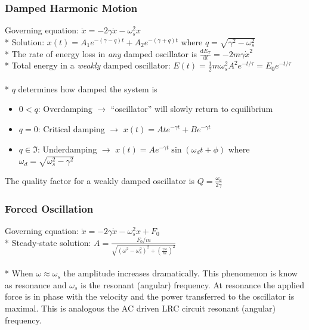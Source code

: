 \subsubsection{Damped Harmonic Motion}
Governing equation: \(\ddot{x}=-2\gamma\dot{x}-\omega_s^2x\)\\*
Solution: \(x(t)=A_1e^{-(\gamma-q)t}+A_2e^{-(\gamma+q)t}\) where \(q=\sqrt{\gamma^2-\omega_s^2}\)\\*
The rate of energy loss in \emph{any} damped oscillator is \(\frac{\mathrm{d}E_T}{\mathrm{d}t}=-2m\gamma\dot{x}^2\)\\*
Total energy in a \emph{weakly} damped oscillator: \(E(t)=\frac{1}{2}m\omega_s^2A^2e^{-t/\tau}=E_0e^{-t/\tau}\)\\\\*
\(q\) determines how damped the system is
\begin{itemize}
\item \(0<q\): Overdamping \(\to\) ``oscillator'' will slowly return to equilibrium
\item \(q=0\): Critical damping \(\to\) \(x(t)=Ate^{-\gamma t}+Be^{-\gamma t}\)
\item \(q\in\Im\): Underdamping \(\to\) \(x(t)=Ae^{-\gamma t}\sin(\omega_dt+\phi)\) where \(\omega_d=\sqrt{\omega_s^2-\gamma^2}\)
\end{itemize}
The quality factor for a weakly damped oscillator is \(Q=\frac{\omega_d}{2\gamma}\)

\subsubsection{Forced Oscillation}
Governing equation: \(\ddot{x}=-2\gamma\dot{x}-\omega_s^2x+F_0\)\\*
Steady-state solution: \(\displaystyle A=\frac{F_0/m}{\sqrt{\left(\omega^2-\omega_s^2\right)^2+\left(\frac{\gamma\omega}{m}\right)^2}}\)\\\\*
When \(\omega\approx\omega_s\) the amplitude increases dramatically. This phenomenon is know as resonance and \(\omega_s\) is the resonant (angular) frequency. At resonance the applied force is in phase with the velocity and the power transferred to the oscillator is maximal. This is analogous the AC driven LRC circuit resonant (angular) frequency.

